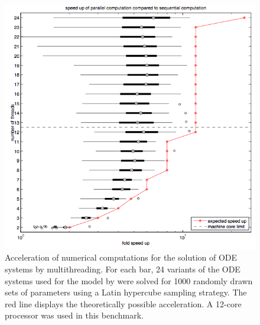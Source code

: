 \documentclass[12pt,a4paper]{scrartcl}
\begin{document}
\begin{figure}
\begin{center}
\includegraphics[width=\textwidth]{./figures_QDM/bachmann_MSB2011_speed_up_test.png}
\end{center}
\caption{Acceleration of numerical computations for the solution of ODE systems by 
multithreading. For each bar, 24 variants of the ODE systems used for the model by 
\citet{Bachmann:2011fk} were solved for 1000 randomly drawn sets of parameters 
using a Latin hypercube sampling strategy. The red line displays the theoretically possible
acceleration. A 12-core processor was used in this benchmark.}
\label{Acceleration}
\end{figure}
\end{document}
